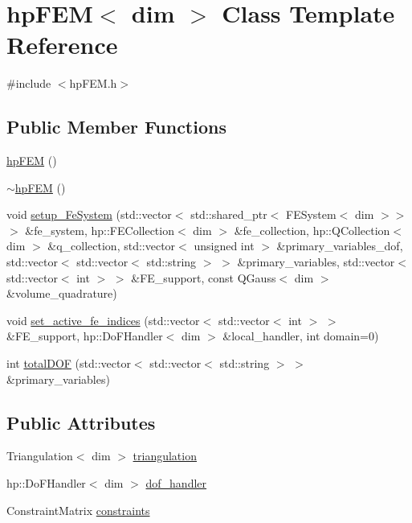 \section{hp\-F\-E\-M$<$ dim $>$ Class Template Reference}
\label{classhp_f_e_m}


{\ttfamily \#include $<$hp\-F\-E\-M.\-h$>$}

\subsection*{Public Member Functions}
\begin{DoxyCompactItemize}
\item 
\hyperlink{classhp_f_e_m_ac1540fdd371c0b89a90809251b618025}{hp\-F\-E\-M} ()
\item 
\hyperlink{classhp_f_e_m_acf426058508649734ee9618b5c9148c1}{$\sim$hp\-F\-E\-M} ()
\item 
void \hyperlink{classhp_f_e_m_afe86b756fb757221f5a8a16c956b7e76}{setup\-\_\-\-Fe\-System} (std\-::vector$<$ std\-::shared\-\_\-ptr$<$ F\-E\-System$<$ dim $>$$>$ $>$ \&fe\-\_\-system, hp\-::\-F\-E\-Collection$<$ dim $>$ \&fe\-\_\-collection, hp\-::\-Q\-Collection$<$ dim $>$ \&q\-\_\-collection, std\-::vector$<$ unsigned int $>$ \&primary\-\_\-variables\-\_\-dof, std\-::vector$<$ std\-::vector$<$ std\-::string $>$ $>$ \&primary\-\_\-variables, std\-::vector$<$ std\-::vector$<$ int $>$ $>$ \&F\-E\-\_\-support, const Q\-Gauss$<$ dim $>$ \&volume\-\_\-quadrature)
\item 
void \hyperlink{classhp_f_e_m_a12205240784051ad249a536cb7ee98d5}{set\-\_\-active\-\_\-fe\-\_\-indices} (std\-::vector$<$ std\-::vector$<$ int $>$ $>$ \&F\-E\-\_\-support, hp\-::\-Do\-F\-Handler$<$ dim $>$ \&local\-\_\-handler, int domain=0)
\item 
int \hyperlink{classhp_f_e_m_a9ceee3881af75e3be863fdb2d1688c0e}{total\-D\-O\-F} (std\-::vector$<$ std\-::vector$<$ std\-::string $>$ $>$ \&primary\-\_\-variables)
\end{DoxyCompactItemize}
\subsection*{Public Attributes}
\begin{DoxyCompactItemize}
\item 
Triangulation$<$ dim $>$ \hyperlink{classhp_f_e_m_a1e604d1e68926caf1ebc67d2a7451783}{triangulation}
\item 
hp\-::\-Do\-F\-Handler$<$ dim $>$ \hyperlink{classhp_f_e_m_ab4df20fb431f370878adc06e19280d62}{dof\-\_\-handler}
\item 
Constraint\-Matrix \hyperlink{classhp_f_e_m_aa08dcec4445eed1687b99cdb7b24b785}{constraints}
\end{DoxyCompactItemize}


